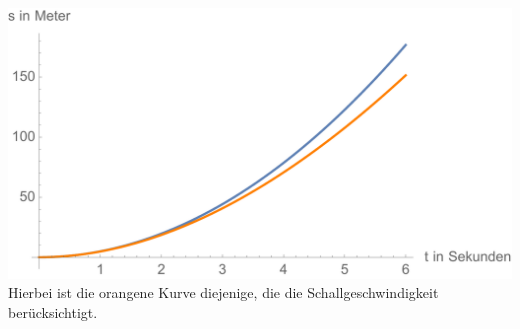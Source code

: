 \documentclass[a4paper,10pt]{extarticle}
\begin{document}
\includegraphics[scale=0.5]{./Abbildungen/Abbildung_03.pdf}
Hierbei ist die orangene Kurve diejenige, die die Schallgeschwindigkeit berücksichtigt.
\end{document}
